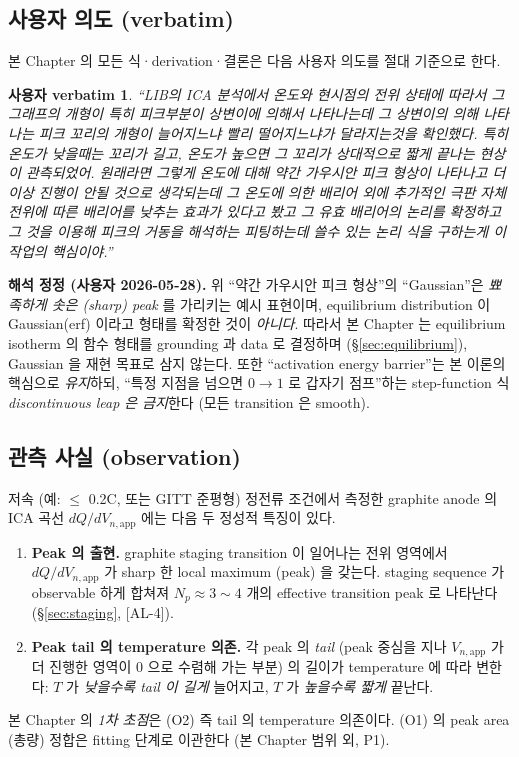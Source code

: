 \documentclass[11pt,a4paper]{article}
\newtheorem*{uservb}{사용자 verbatim}
\newcommand{\app}{\mathrm{app}}
\newcommand{\AL}[1]{\textsf{[AL-#1]}}
\begin{document}
\subsection{사용자 의도 (verbatim)}\label{sec:verbatim}
본 Chapter 의 모든 식·derivation·결론은 다음 사용자 의도를 절대 기준으로 한다.
\begin{uservb}
``LIB의 ICA 분석에서 온도와 현시점의 전위 상태에 따라서 그 그래프의 개형이 특히
피크부분이 상변이에 의해서 나타나는데 그 상변이의 의해 나타나는 피크 꼬리의 개형이
늘어지느냐 빨리 떨어지느냐가 달라지는것을 확인했다. 특히 온도가 낮을때는 꼬리가
길고, 온도가 높으면 그 꼬리가 상대적으로 짧게 끝나는 현상이 관측되었어. 원래라면
그렇게 온도에 대해 약간 가우시안 피크 형상이 나타나고 더이상 진행이 안될 것으로
생각되는데 그 온도에 의한 배리어 외에 추가적인 극판 자체 전위에 따른 배리어를
낮추는 효과가 있다고 봤고 그 유효 배리어의 논리를 확정하고 그 것을 이용해 피크의
거동을 해석하는 피팅하는데 쓸수 있는 논리 식을 구하는게 이 작업의 핵심이야.''
\end{uservb}

\textbf{해석 정정 (사용자 2026-05-28).} 위 ``약간 가우시안 피크 형상''의 ``Gaussian''은
\emph{뾰족하게 솟은 (sharp) peak} 를 가리키는 예시 표현이며, equilibrium distribution
이 Gaussian(erf) 이라고 형태를 확정한 것이 \emph{아니다}. 따라서 본 Chapter 는 equilibrium
isotherm 의 함수 형태를 grounding 과 data 로 결정하며 (\S\ref{sec:equilibrium}), Gaussian
을 재현 목표로 삼지 않는다. 또한 ``activation energy barrier''는 본 이론의 핵심으로
\emph{유지}하되, ``특정 지점을 넘으면 $0\!\to\!1$ 로 갑자기 점프''하는 step-function 식
\emph{discontinuous leap 은 금지}한다 (모든 transition 은 smooth).

\subsection{관측 사실 (observation)}\label{sec:observation}
저속 (예: $\le$ 0.2C, 또는 GITT 준평형) 정전류 조건에서 측정한 graphite anode 의 ICA
곡선 $dQ/dV_{n,\app}$ 에는 다음 두 정성적 특징이 있다.
\begin{enumerate}[label=\textbf{(O\arabic*)}]
\item \textbf{Peak 의 출현.} graphite staging transition 이 일어나는 전위 영역에서
  $dQ/dV_{n,\app}$ 가 sharp 한 local maximum (peak) 을 갖는다. staging sequence 가
  observable 하게 합쳐져 $N_p\approx 3\sim4$ 개의 effective transition peak 로 나타난다
  (\S\ref{sec:staging}, \AL{4}).
\item \textbf{Peak tail 의 temperature 의존.} 각 peak 의 \emph{tail} (peak 중심을 지나
  $V_{n,\app}$ 가 더 진행한 영역이 0 으로 수렴해 가는 부분) 의 길이가 temperature 에
  따라 변한다: $T$ 가 \emph{낮을수록 tail 이 길게} 늘어지고, $T$ 가 \emph{높을수록 짧게}
  끝난다.
\end{enumerate}
본 Chapter 의 \emph{1차 초점}은 (O2) 즉 tail 의 temperature 의존이다. (O1) 의 peak area
(총량) 정합은 fitting 단계로 이관한다 (본 Chapter 범위 외, P1).
\end{document}
